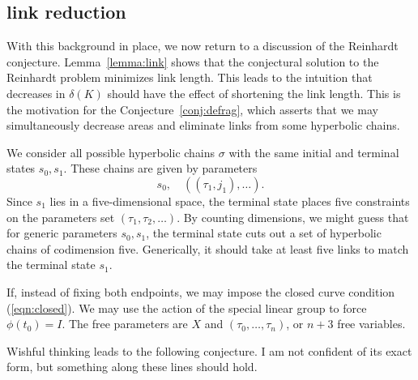 \documentclass[11pt]{amsart}
\def\deltalat{\mathbb\delta}  %
\def\ta{{\tau}}
\begin{document}
\subsection{link reduction}

With this background in place, we now return to a discussion of the
Reinhardt conjecture.  Lemma~\ref{lemma:link} shows that the
conjectural solution to the Reinhardt problem minimizes link
length.  This leads to the intuition 
that decreases in $\deltalat(K)$ should have
the effect of shortening the link length.  This is the motivation
for the Conjecture~\ref{conj:defrag}, which asserts that we may
simultaneously decrease areas and eliminate links
from some hyperbolic chains.   

We consider all possible hyperbolic chains $\sigma$ with the same
initial and terminal states $s_0,s_1$.  These chains are given by
parameters
  $$
  s_0,\quad ((\ta_1,j_1),\ldots).
  $$
Since $s_1$ lies in a five-dimensional space, the terminal state
places five constraints on the parameters set $(\ta_1,\ta_2,\ldots)$.  
By counting dimensions, we
might guess that for generic parameters $s_0,s_1$, the terminal
state cuts out a set of hyperbolic chains of codimension five.
Generically, it should take at least five links to match the terminal state $s_1$.

If, instead of fixing both endpoints, we may impose the closed
curve condition (\ref{eqn:closed}). We may use the action of
the special linear group to force $\phi(t_0)=I$.  The free
parameters are $X$ and $(\ta_0,\ldots,\ta_n)$, or $n+3$ free
variables.  


Wishful thinking leads to the following conjecture.  I am not confident
of its exact form, but something along these lines should hold.
\end{document}
